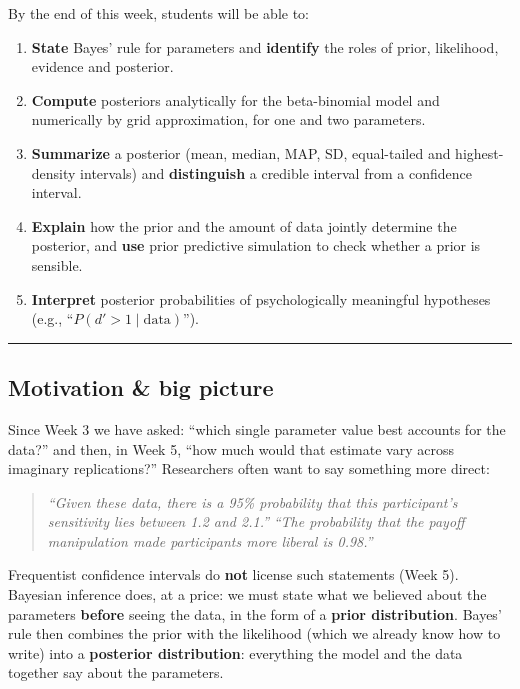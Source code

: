 By the end of this week, students will be able to:

\begin{enumerate}
\def\labelenumi{\arabic{enumi}.}
\tightlist
\item
  \textbf{State} Bayes' rule for parameters and \textbf{identify} the
  roles of prior, likelihood, evidence and posterior.
\item
  \textbf{Compute} posteriors analytically for the beta-binomial model
  and numerically by grid approximation, for one and two parameters.
\item
  \textbf{Summarize} a posterior (mean, median, MAP, SD, equal-tailed
  and highest-density intervals) and \textbf{distinguish} a credible
  interval from a confidence interval.
\item
  \textbf{Explain} how the prior and the amount of data jointly
  determine the posterior, and \textbf{use} prior predictive simulation
  to check whether a prior is sensible.
\item
  \textbf{Interpret} posterior probabilities of psychologically
  meaningful hypotheses (e.g., ``\(P(d' > 1 \mid \text{data})\)'').
\end{enumerate}

\begin{center}\rule{0.5\linewidth}{0.5pt}\end{center}

\subsection{Motivation \& big picture}

Since Week 3 we have asked: ``which single parameter value best accounts
for the data?'' and then, in Week 5, ``how much would that estimate vary
across imaginary replications?'' Researchers often want to say something
more direct:

\begin{quote}
\emph{``Given these data, there is a 95\% probability that this
participant's sensitivity lies between 1.2 and 2.1.''} \emph{``The
probability that the payoff manipulation made participants more liberal
is 0.98.''}
\end{quote}

Frequentist confidence intervals do \textbf{not} license such statements
(Week 5). Bayesian inference does, at a price: we must state what we
believed about the parameters \textbf{before} seeing the data, in the
form of a \textbf{prior distribution}. Bayes' rule then combines the
prior with the likelihood (which we already know how to write) into a
\textbf{posterior distribution}: everything the model and the data
together say about the parameters.

